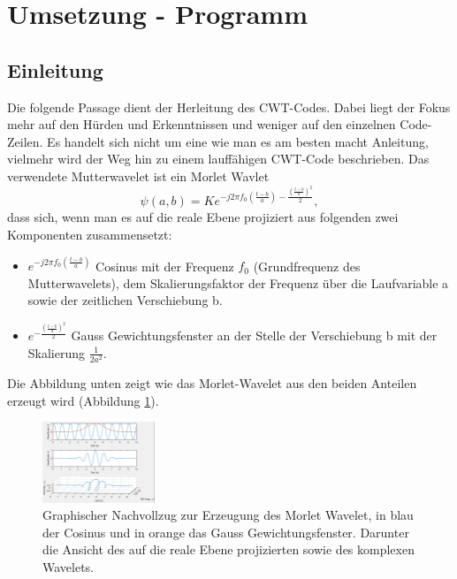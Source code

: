 %
%
%
%
\section{Umsetzung - Programm 
\label{wavelets:section:teil2}}

\subsection{Einleitung
\label{wavelets:subsection:Einleitung}}
Die folgende Passage dient der Herleitung des CWT-Codes. Dabei liegt der Fokus mehr auf den Hürden und Erkenntnissen und weniger auf den einzelnen Code-Zeilen. Es handelt sich nicht um eine wie man es am besten macht Anleitung, vielmehr wird der Weg hin zu einem lauffähigen CWT-Code beschrieben.
Das verwendete Mutterwavelet ist ein Morlet Wavlet \[\psi(a,b)=Ke^{-j2\pi f_0\left(\frac{t-b}{a}\right)-\frac{\left(\frac{t-b}{a}\right)^2}{2}},\] dass sich, wenn man es auf die reale Ebene projiziert aus folgenden zwei Komponenten zusammensetzt:
\begin{itemize}
	\item $e^{-j2\pi f_0\left(\frac{t-b}{a}\right)}$ Cosinus mit der Frequenz $f_0$ (Grundfrequenz des Mutterwavelets), dem Skalierungsfaktor der Frequenz über die Laufvariable a sowie der zeitlichen Verschiebung b.
	\item $e^{-\frac{\left(\frac{t-b}{a}\right)^2}{2}}$	Gauss Gewichtungsfenster an der Stelle der Verschiebung b mit der Skalierung $\frac{1}{2a^2}$.
\end{itemize}

Die Abbildung unten zeigt wie das Morlet-Wavelet aus den beiden Anteilen erzeugt wird (Abbildung \ref{wavelet:fig:MorletWavelet}).

\begin{figure}
	\centering
	\includegraphics[width=0.3\textwidth]{papers/wavelets/images/7_MorletWavelet.png}
	\caption{Graphischer Nachvollzug zur Erzeugung des Morlet Wavelet, in blau der Cosinus und in orange das Gauss Gewichtungsfenster. Darunter die Ansicht des auf die reale Ebene projizierten sowie des komplexen Wavelets.}
	\label{wavelet:fig:MorletWavelet}
\end{figure}


